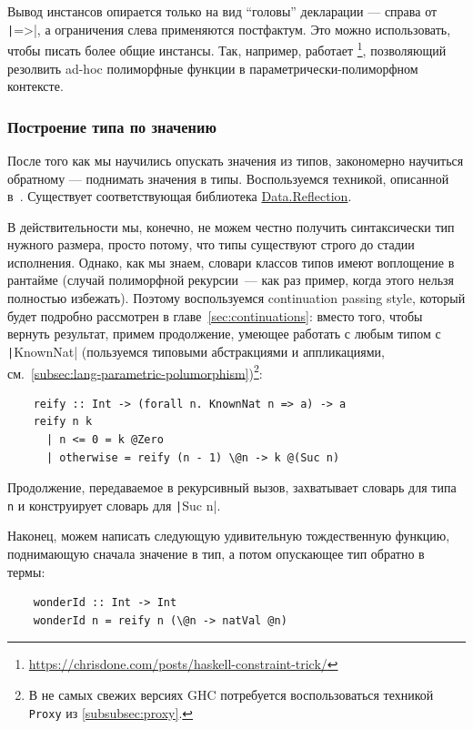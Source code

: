 Вывод инстансов опирается только на вид ``головы'' декларации --- справа от \texttt|=>|, а ограничения слева применяются постфактум.
Это можно использовать, чтобы писать более общие инстансы.
Так, например, работает \footnote{\url{https://chrisdone.com/posts/haskell-constraint-trick/}}, позволяющий резолвить ad-hoc полиморфные функции в параметрически-полиморфном контексте.

\subsubsection{Построение типа по значению} \label{subsubsec:reify}

После того как мы научились опускать значения из типов, закономерно научиться обратному --- поднимать значения в типы.
Воспользуемся техникой, описанной в~\cite{kiselyov2004functional}.
Существует соответствующая библиотека \href{https://hackage.haskell.org/package/reflection-2.1.6/docs/Data-Reflection.html}{Data.Reflection}. %

В действительности мы, конечно, не можем честно получить синтаксически тип нужного размера, просто потому, что типы существуют строго до стадии исполнения.
Однако, как мы знаем, словари классов типов имеют воплощение в рантайме (случай полиморфной рекурсии~--- как раз пример, когда этого нельзя полностью избежать).
Поэтому воспользуемся continuation passing style, который будет подробно рассмотрен в главе~\ref{sec:continuations}: вместо того, чтобы вернуть результат, примем продолжение, умеющее работать с любым типом с \texttt|KnownNat| (пользуемся типовыми абстракциями и аппликациями, см.\ \ref{subsec:lang-parametric-polumorphism})\footnote{В не самых свежих версиях GHC потребуется воспользоваться техникой \texttt{Proxy} из \ref{subsubsec:proxy}.}:
\begin{verbatim}
    reify :: Int -> (forall n. KnownNat n => a) -> a
    reify n k
      | n <= 0 = k @Zero
      | otherwise = reify (n - 1) \@n -> k @(Suc n)
\end{verbatim}

Продолжение, передаваемое в рекурсивный вызов, захватывает словарь для типа \texttt{n} и конструирует словарь для \texttt|Suc n|.

Наконец, можем написать следующую удивительную тождественную функцию, поднимающую сначала значение в тип, а потом опускающее тип обратно в термы:
\begin{verbatim}
    wonderId :: Int -> Int
    wonderId n = reify n (\@n -> natVal @n)
\end{verbatim}

